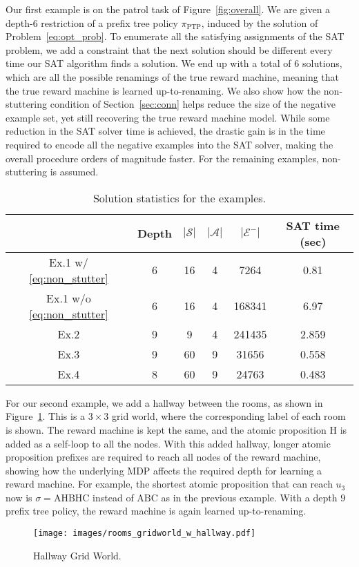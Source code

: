 \documentclass[letterpaper, 10 pt, conference]{ieeeconf}
\newcommand{\ptp}{\pi_{\mathrm{PTP}}}
\newcommand{\sectionref}[1]{Section~\ref{#1}}
\begin{document}
Our first example is on the patrol task of Figure~\ref{fig:overall}. We are given a depth-$6$ restriction of a prefix tree policy $\ptp$, induced by the solution of Problem~\eqref{eq:opt_prob}. To enumerate all the satisfying assignments of the SAT problem, we add a constraint that the next solution should be different every time our SAT algorithm finds a solution. We end up with a total of $6$ solutions, which are all the possible renamings of the true reward machine, meaning that the true reward machine is learned up-to-renaming.  We also show how the non-stuttering condition of \sectionref{sec:conn} helps reduce the size of the negative example set, yet still recovering the true reward machine model. While some reduction in the SAT solver time is achieved, the drastic gain is in the time required to encode all the negative examples into the SAT solver, making the overall procedure orders of magnitude faster. For the remaining examples, non-stuttering is assumed.

\begin{table}[h]
    \centering
    \begin{tabular}{|c|c|c|c|c|c|}
    \hline
        & Depth & $|\mathcal{S}|$& $|\mathcal{A}|$ & $|\mathcal{E}^-|$ & SAT time (sec) \\ \hline 
        Ex.1 w/ \eqref{eq:non_stutter} &  6 & 16 & 4& 7264 & 0.81  \\ \hline  
        Ex.1 w/o \eqref{eq:non_stutter} &  6 & 16 & 4& 168341 & 6.97  \\ \hline  
        Ex.2 &  9 & 9 & 4&241435 & 2.859  \\ \hline
        Ex.3 &  9 & 60 & 9&31656 & 0.558 \\ \hline
        Ex.4 &  8 & 60 & 9&24763 & 0.483  \\ \hline
    \end{tabular}
    \caption{Solution statistics for the examples.}
    \label{tab:stat_exp1}
    \vspace{-0.4cm}
\end{table}



For our second example, we add a hallway between the rooms, as shown in Figure~\ref{fig:rooms_with_hallway}. This is a $3\times3$ grid world, where the corresponding label of each room is shown. The reward machine is kept the same, and the atomic proposition $\mathrm{H}$ is added as a self-loop to all the nodes. With this added hallway, longer atomic proposition prefixes are required to reach all nodes of the reward machine, showing how the underlying MDP affects the required depth for learning a reward machine. For example, the shortest atomic proposition that can reach $u_3$ now is $\sigma = \mathrm{AHBHC}$ instead of $\mathrm{ABC}$ as in the previous example. With a depth $9$ prefix tree policy, the reward machine is again learned up-to-renaming. 
\begin{figure}
    \centering
    \texttt{[image: images/rooms\_gridworld\_w\_hallway.pdf]}
    \caption{Hallway Grid World.}
    \label{fig:rooms_with_hallway}
\end{figure}
\end{document}
